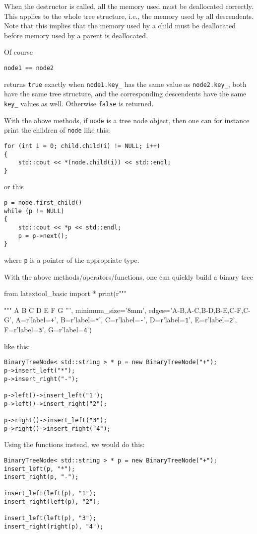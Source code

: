 When the destructor is called, all the memory used must be 
deallocated
correctly. This applies to the whole tree structure, i.e.,
the memory used by all descendents.
Note that this implies that the memory used by a child must be 
deallocated before memory used by a parent is deallocated.

Of course 
\begin{Verbatim}[frame=single,fontsize=\footnotesize]
node1 == node2
\end{Verbatim}
returns \verb!true! exactly when \verb!node1.key_!
has the same value as \verb!node2.key_!,
both have the same tree structure, and the corresponding
descendents have the same \verb!key_! values as well.
Otherwise \verb!false! is returned.

With the above methods, if \verb!node! is a tree node object,
then one can for instance print the children of \verb!node! like this:
\begin{Verbatim}[frame=single,fontsize=\footnotesize]
for (int i = 0; child.child(i) != NULL; i++)
{
    std::cout << *(node.child(i)) << std::endl;
}
\end{Verbatim}
or this 
\begin{Verbatim}[frame=single,fontsize=\footnotesize]
p = node.first_child()
while (p != NULL)
{
    std::cout << *p << std::endl;
    p = p->next();
}
\end{Verbatim}
where \verb!p! is a pointer of the appropriate type.

With the above methods/operators/functions,
one can quickly build a binary tree
\begin{python}
from latextool_basic import *
print(r"""
\begin{center}
\end{center}
""" %
   A
 B   C
D E F G
''',
minimum_size='8mm',
edges='A-B,A-C,B-D,B-E,C-F,C-G',
A=r'label=\texttt{+}',
B=r'label=\texttt{*}',
C=r'label=\texttt{-}',
D=r'label=\texttt{1}',
E=r'label=\texttt{2}',
F=r'label=\texttt{3}',
G=r'label=\texttt{4}')
\end{python}
like this:
\begin{Verbatim}[frame=single,fontsize=\footnotesize]
BinaryTreeNode< std::string > * p = new BinaryTreeNode("+");
p->insert_left("*");
p->insert_right("-");

p->left()->insert_left("1");
p->left()->insert_right("2");

p->right()->insert_left("3");
p->right()->insert_right("4");
\end{Verbatim}
Using the functions instead, we would do this:
\begin{Verbatim}[frame=single,fontsize=\footnotesize]
BinaryTreeNode< std::string > * p = new BinaryTreeNode("+");
insert_left(p, "*");
insert_right(p, "-");

insert_left(left(p), "1");
insert_right(left(p), "2");

insert_left(left(p), "3");
insert_right(right(p), "4");
\end{Verbatim}
